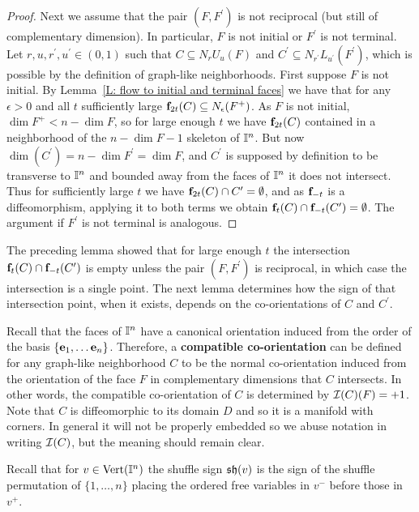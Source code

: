 \begin{proof}
	Next we assume that the pair $(F,F^\prime)$ is not reciprocal (but still of complementary dimension). In particular, $F$ is not initial or $F^\prime$ is not terminal.
	Let $r,u,r^\prime,u^\prime \in (0,1)$ such that $C \subseteq N_rU_u(F)$ and $C^\prime \subseteq N_{r^\prime}L_{u^\prime}(F^\prime)$, which is possible by the definition of graph-like neighborhoods.
	First suppose $F$ is not initial.
	By Lemma~\ref{L: flow to initial and terminal faces} we have that for any $\epsilon > 0$ and all $t$ sufficiently large $\mathbf{f}_{2t}(C) \subseteq N_\epsilon(F^+)$.
	As $F$ is not initial, $\dim F^+ < n-\dim F$, so for large enough $t$ we have $\mathbf{f}_{2t}(C)$ contained in a neighborhood of the $n-\dim F-1$ skeleton of $\mathbb{I}^n$. But now $\dim(C^\prime) = n-\dim F^\prime = \dim F$, and $C^\prime$ is supposed by definition to be transverse to $\mathbb{I}^n$ and bounded away from the faces of $\mathbb{I}^n$ it does not intersect.
	Thus for sufficiently large $t$ we have $\mathbf{f}_{2t}(C)\cap C^\prime = \emptyset$, and as $\mathbf{f}_{-t}$ is a diffeomorphism, applying it to both terms we obtain $\mathbf{f}_{t}(C) \cap \mathbf{f}_{-t} (C^\prime) = \emptyset$.
	The argument if $F^\prime$ is not terminal is analogous.
\end{proof}

The preceding lemma showed that for large enough $t$ the intersection $\mathbf{f}_t(C) \cap \mathbf{f}_{-t}(C^\prime)$ is empty unless the pair $(F,F^\prime)$ is reciprocal, in which case the intersection is a single point.
The next lemma determines how the sign of that intersection point, when it exists, depends on the co-orientations of $C$ and $C^\prime$.

Recall that the faces of $\mathbb{I}^n$ have a canonical orientation induced from the order of the basis $\{\mathbf{e}_1, \dots \mathbf{e}_n\}$.
Therefore, a \textbf{compatible co-orientation} can be defined for any graph-like neighborhood $C$ to be the normal co-orientation induced from the orientation of the face $F$ in complementary dimensions that $C$ intersects.
In other words, the compatible co-orientation of $C$ is determined by $\mathcal{I}(C)(F) = +1$. Note that $C$ is diffeomorphic to its domain $D$ and so it is a manifold with corners. In general it will not be properly embedded so we abuse notation in writing $\mathcal{I}(C)$, but the meaning should remain clear.

Recall that for $v \in {\rm Vert}(\mathbb{I}^n)$ the shuffle sign $\mathfrak{sh}(v)$ is the sign of the shuffle permutation of $\{1, \dots, n\}$ placing the ordered free variables in $v^-$ before those in $v^+$.

